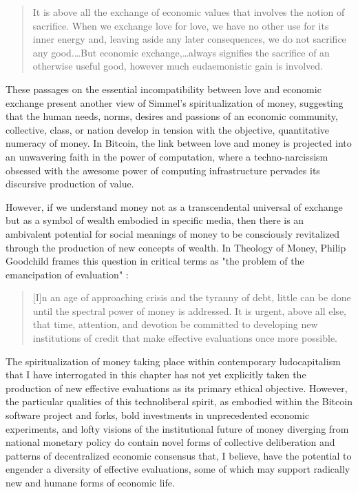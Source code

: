 \blockcquote[80]{Simmel04}{
  It is above all the exchange of economic values that involves the notion of sacrifice. When we exchange love for love, we have no other use for its inner energy and, leaving aside any later consequences, we do not sacrifice any good.…But economic exchange,…always signifies the sacrifice of an otherwise useful good, however much eudaemonistic gain is involved.
}
These passages on the essential incompatibility between love and economic exchange present another view of Simmel's spiritualization of money, suggesting that the human needs, norms, desires and passions of an economic community, collective, class, or nation develop in tension with the objective, quantitative numeracy of money. In Bitcoin, the link between love and money is projected into an unwavering faith in the power of computation, where a techno-narcissism obsessed with the awesome power of computing infrastructure pervades its discursive production of value.

However, if we understand money not as a transcendental universal of exchange but as a symbol of wealth embodied in specific media, then there is an ambivalent potential for social meanings of money to be consciously revitalized through the production of new concepts of wealth. In Theology of Money, Philip Goodchild frames this question in critical terms as "the problem of the emancipation of evaluation" \autocite*[258]{Goodchild2009-xg}:
\blockcquote[259]{Goodchild2009-xg}{
  [I]n an age of approaching crisis and the tyranny of debt, little can be done until the spectral power of money is addressed. It is urgent, above all else, that time, attention, and devotion be committed to developing new institutions of credit that make effective evaluations once more possible.
}
The spiritualization of money taking place within contemporary ludocapitalism that I have interrogated in this chapter has not yet explicitly taken the production of new effective evaluations as its primary ethical objective. However, the particular qualities of this technoliberal spirit, as embodied within the Bitcoin software project and forks, bold investments in unprecedented economic experiments, and lofty visions of the institutional future of money diverging from national monetary policy do contain novel forms of collective deliberation and patterns of decentralized economic consensus that, I believe, have the potential to engender a diversity of effective evaluations, some of which may support radically new and humane forms of economic life.

